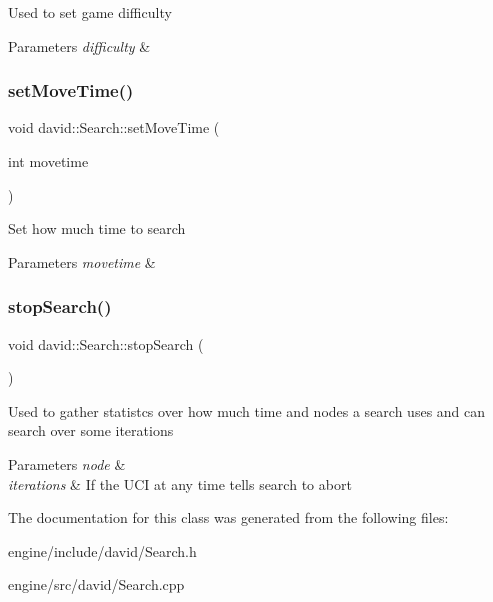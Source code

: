Used to set game difficulty 
\begin{DoxyParams}{Parameters}
{\em difficulty} & \\
\hline
\end{DoxyParams}
\mbox{\label{classdavid_1_1Search_ae56889dbafede8407e4edb397cd2d19b}} 
\subsubsection{\texorpdfstring{set\+Move\+Time()}{setMoveTime()}}
{\footnotesize\ttfamily void david\+::\+Search\+::set\+Move\+Time (\begin{DoxyParamCaption}\item[{int}]{movetime }\end{DoxyParamCaption})}

Set how much time to search 
\begin{DoxyParams}{Parameters}
{\em movetime} & \\
\hline
\end{DoxyParams}
\mbox{\label{classdavid_1_1Search_a2606078550d8ea05738960a9f171de08}} 
\subsubsection{\texorpdfstring{stop\+Search()}{stopSearch()}}
{\footnotesize\ttfamily void david\+::\+Search\+::stop\+Search (\begin{DoxyParamCaption}{ }\end{DoxyParamCaption})}

Used to gather statistcs over how much time and nodes a search uses and can search over some iterations 
\begin{DoxyParams}{Parameters}
{\em node} & \\
\hline
{\em iterations} & If the U\+CI at any time tells search to abort \\
\hline
\end{DoxyParams}


The documentation for this class was generated from the following files\+:\begin{DoxyCompactItemize}
\item 
engine/include/david/Search.\+h\item 
engine/src/david/Search.\+cpp\end{DoxyCompactItemize}
